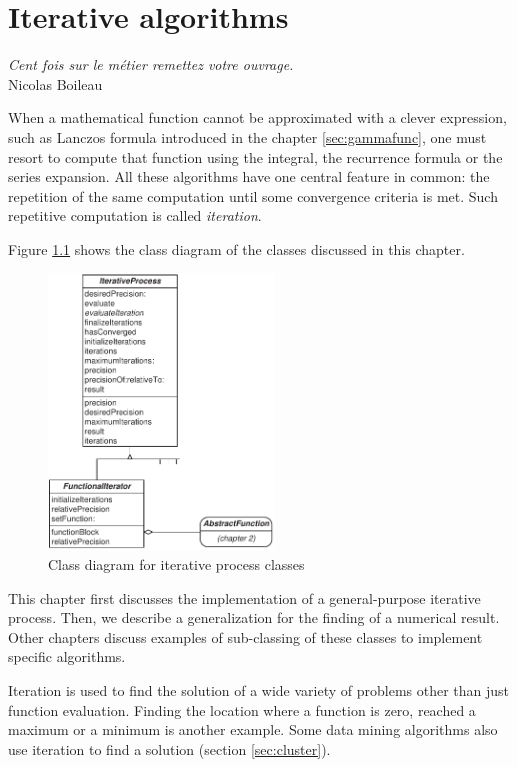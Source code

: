 \documentclass[twoside]{book}
\begin{document}
\fi

\chapter{Iterative algorithms}
\label{ch:iteration} \vspace{1 ex}
\begin{flushright}
{\sl Cent fois sur le m\'etier remettez votre ouvrage.}\\ Nicolas
Boileau
\end{flushright}
\vspace{1 ex} When a mathematical function cannot be approximated
with a clever expression, such as Lanczos formula introduced in
the chapter \ref{sec:gammafunc}, one must resort to compute that
function using the integral, the recurrence formula or the series
expansion. All these algorithms have one central feature in
common: the repetition of the same computation until some
convergence criteria is met. Such repetitive computation is called
{\it iteration}.

Figure \ref{cl:iteration} shows the class diagram of the classes
discussed in this chapter.
\begin{figure}
\centering\includegraphics[width=6cm]{Figures/IterationClasses}
\caption{Class diagram for iterative process
classes}\label{cl:iteration}
\end{figure}
This chapter first discusses the implementation of a
general-purpose iterative process. Then, we describe a
generalization for the finding of a numerical result. Other
chapters discuss examples of sub-classing of these classes to
implement specific algorithms.

Iteration is used to find the solution of a wide variety of
problems other than just function evaluation. Finding the location
where a function is zero, reached a maximum or a minimum is
another example. Some data mining algorithms also use iteration to
find a solution (\cf section \ref{sec:cluster}).
\end{document}
